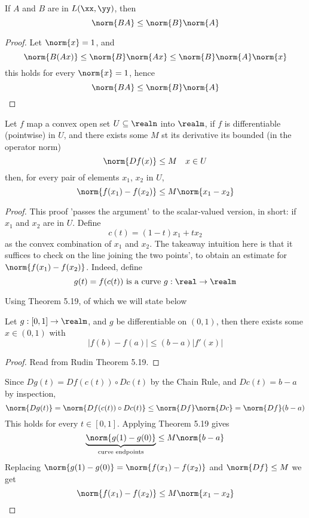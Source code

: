 \documentclass[../main-v2-manifolds.tex]{subfiles}
\begin{document}
\begin{wts}\label{rudin-chp9-theorem-9.7}
    If $A$ and $B$ are in $L(\xx,\yy)$, then 
    \[
        \norm{BA}\leq\norm{B}\norm{A}
    \]
\end{wts}
\begin{proof}
    Let $\norm{x}=1$, and 
    \[
        \norm{B(Ax)}\leq\norm{B}\norm{Ax}\leq\norm{B}\norm{A}\norm{x}
    \]
    this holds for every $\norm{x}=1$, hence
    \[
        \norm{BA}\leq\norm{B}\norm{A}
    \]
\end{proof}
\begin{wts}\label{rudin-chp9-theorem-9.19}
    Let $f$ map a convex open set $U\subseteq\realn$ into $\realm$, if $f$ is differentiable (pointwise) in $U$, and there exists some $M$ st its derivative its bounded (in the operator norm)
    \[
        \norm{Df(x)}\leq M\quad x\in U
    \]
    then, for every pair of elements $x_1$, $x_2$ in $U$,
    \[
        \norm{f(x_1)-f(x_2)}\leq M\norm{x_1-x_2}
    \]
\end{wts}
\begin{proof}
    This proof 'passes the argument' to the scalar-valued version, in short: if $x_1$ and $x_2$ are in $U$. Define
    \[
        c(t) = (1-t)x_1 + tx_2
    \]
    as the convex combination of $x_1$ and $x_2$. The takeaway intuition here is that it suffices to check on the line joining the two points', to obtain an estimate for $\norm{f(x_1)-f(x_2)}$. Indeed, define
    \[
        g(t) = f(c(t))\text{ is a curve } g:\real\to\realm
    \]
    
    Using Theorem 5.19, of which we will state below
    \begin{wts}
        Let $g: [0,1]\to\realm$, and $g$ be differentiable on $(0,1)$, then there exists some $x\in (0,1)$ with
        \[
            |f(b)-f(a)|\leq (b-a)|f'(x)|
        \]
    \end{wts}
    \begin{proof}
        Read from Rudin Theorem 5.19.
    \end{proof}

    Since $Dg(t) = Df(c(t))\circ Dc(t)$ by the Chain Rule, and $Dc(t) = b-a$ by inspection,
    \[
        \norm{Dg(t)} = \norm{Df(c(t))\circ Dc(t)}\leq \norm{Df}\norm{Dc} = \norm{Df}(b-a)
    \]
    This holds for every $t\in [0,1]$. Applying Theorem 5.19 gives
    \[
        \underbrace{\norm{g(1)-g(0)}}_{\text{curve endpoints}}\leq M\norm{b-a}
    \]
    Replacing $\norm{g(1)-g(0)} = \norm{f(x_1) - f(x_2)}$ and $\norm{Df}\leq M$ we get
    \[
        \norm{f(x_1) - f(x_2)}\leq M \norm{x_1 - x_2}
    \]
\end{proof}
\end{document}
